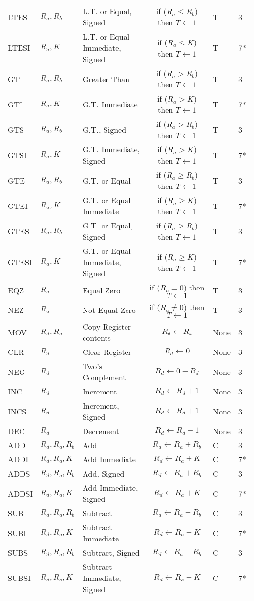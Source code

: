 \documentclass[12pt,twoside]{report}
\begin{document}
{\begin{longtable}{ | l | l | l | c | l | l | }
LTES & $R_a, R_b$ & L.T. or Equal, Signed & if ($R_a \le R_b$) then $T \leftarrow 1$ & T & 3 \\
LTESI & $R_a, K$ & L.T. or Equal Immediate, Signed & if ($R_a \le K$) then $T \leftarrow 1$ & T & 7* \\
GT & $R_a, R_b$ & Greater Than & if ($R_a > R_b$) then $T \leftarrow 1$ & T & 3 \\
GTI & $R_a, K$ & G.T. Immediate & if ($R_a > K$) then $T \leftarrow 1$ & T & 7* \\
GTS & $R_a, R_b$ & G.T., Signed & if ($R_a > R_b$) then $T \leftarrow 1$ & T & 3 \\
GTSI & $R_a, K$ & G.T. Immediate, Signed & if ($R_a > K$) then $T \leftarrow 1$ & T & 7* \\
GTE & $R_a, R_b$ & G.T. or Equal & if ($R_a \ge R_b$) then $T \leftarrow 1$ & T & 3 \\
GTEI & $R_a, K$ & G.T. or Equal Immediate & if ($R_a \ge K$) then $T \leftarrow 1$ & T & 7* \\
GTES & $R_a, R_b$ & G.T. or Equal, Signed & if ($R_a \ge R_b$) then $T \leftarrow 1$ & T & 3 \\
GTESI & $R_a, K$ & G.T. or Equal Immediate, Signed & if ($R_a \ge K$) then $T \leftarrow 1$ & T & 7* \\
EQZ & $R_a$ & Equal Zero & if ($R_a = 0$) then $T \leftarrow 1$ & T & 3 \\
NEZ & $R_a$ & Not Equal Zero & if ($R_a \neq 0$) then $T \leftarrow 1$ & T & 3 \\
MOV & $R_d, R_a$ & Copy Register contents & $R_d \leftarrow R_a$ & None & 3 \\
CLR & $R_d$ & Clear Register & $R_d \leftarrow 0$ & None & 3 \\
NEG & $R_d$ & Two's Complement & $R_d \leftarrow 0 - R_d$ & None & 3 \\
INC & $R_d$ & Increment & $R_d \leftarrow R_d + 1$ & None & 3 \\
INCS & $R_d$ & Increment, Signed & $R_d \leftarrow R_d + 1$ & None & 3 \\
DEC & $R_d$ & Decrement & $R_d \leftarrow R_d - 1$ & None & 3 \\
ADD & $R_d, R_a, R_b$ & Add & $R_d \leftarrow R_a + R_b$ & C & 3 \\
ADDI & $R_d, R_a, K$ & Add Immediate & $R_d \leftarrow R_a + K$ & C & 7* \\
ADDS & $R_d, R_a, R_b$ & Add, Signed & $R_d \leftarrow R_a + R_b$ & C & 3 \\
ADDSI & $R_d, R_a, K$ & Add Immediate, Signed & $R_d \leftarrow R_a + K$ & C & 7* \\
SUB & $R_d, R_a, R_b$ & Subtract & $R_d \leftarrow R_a - R_b$ & C & 3 \\
SUBI & $R_d, R_a, K$ & Subtract Immediate & $R_d \leftarrow R_a - K$ & C & 7* \\
SUBS & $R_d, R_a, R_b$ & Subtract, Signed & $R_d \leftarrow R_a - R_b$ & C & 3 \\
SUBSI & $R_d, R_a, K$ & Subtract Immediate, Signed & $R_d \leftarrow R_a - K$ & C & 7* \\
 \hline
\end{longtable}}
\end{document}
